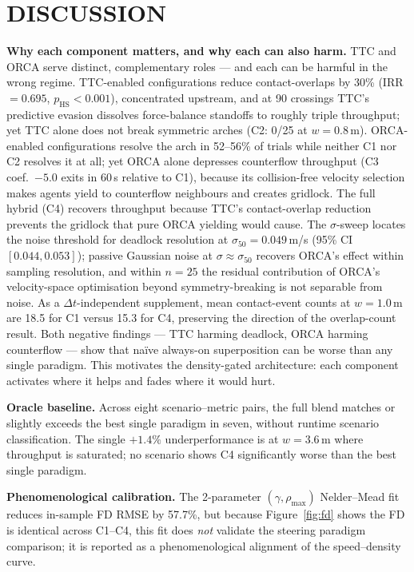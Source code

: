 \documentclass[a4paper,twoside]{article}
\begin{document}
\section{\uppercase{Discussion}}
\label{sec:discussion}

\textbf{Why each component matters, and why each can also harm.}
TTC and ORCA serve distinct, complementary roles --- and each can be harmful in the wrong regime. TTC-enabled configurations reduce contact-overlaps by 30\% (IRR $=0.695$, $p_{\mathrm{HS}}<0.001$), concentrated upstream, and at 90\textdegree{} crossings TTC's predictive evasion dissolves force-balance standoffs to roughly triple throughput; yet TTC alone does not break symmetric arches (C2: 0/25 at $w=0.8$\,m). ORCA-enabled configurations resolve the arch in 52--56\% of trials while neither C1 nor C2 resolves it at all; yet ORCA alone depresses counterflow throughput (C3 coef.\ $-5.0$ exits in 60\,s relative to C1), because its collision-free velocity selection makes agents yield to counterflow neighbours and creates gridlock. The full hybrid (C4) recovers throughput because TTC's contact-overlap reduction prevents the gridlock that pure ORCA yielding would cause. The $\sigma$-sweep locates the noise threshold for deadlock resolution at $\sigma_{50}=0.049$\,m/s (95\% CI $[0.044,0.053]$); passive Gaussian noise at $\sigma\approx\sigma_{50}$ recovers ORCA's effect within sampling resolution, and within $n=25$ the residual contribution of ORCA's velocity-space optimisation beyond symmetry-breaking is not separable from noise. As a $\Delta t$-independent supplement, mean contact-event counts at $w=1.0$\,m are 18.5 for C1 versus 15.3 for C4, preserving the direction of the overlap-count result. Both negative findings --- TTC harming deadlock, ORCA harming counterflow --- show that na\"ive always-on superposition can be worse than any single paradigm. This motivates the density-gated architecture: each component activates where it helps and fades where it would hurt.

\textbf{Oracle baseline.}
Across eight scenario--metric pairs, the full blend matches or slightly exceeds the best single paradigm in seven, without runtime scenario classification. The single $+1.4\%$ underperformance is at $w=3.6$\,m where throughput is saturated; no scenario shows C4 significantly worse than the best single paradigm.

\textbf{Phenomenological calibration.}
The 2-parameter $(\gamma,\rho_{\max})$ Nelder--Mead fit reduces in-sample FD RMSE by 57.7\%, but because Figure~\ref{fig:fd} shows the FD is identical across C1--C4, this fit does \emph{not} validate the steering paradigm comparison; it is reported as a phenomenological alignment of the speed--density curve.
\end{document}
